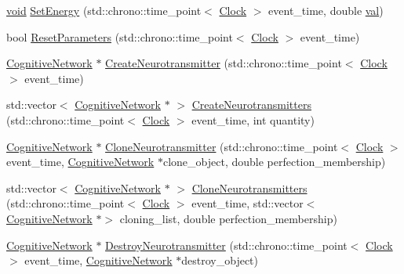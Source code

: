 \begin{DoxyCompactItemize}
\item 
\mbox{\hyperlink{glad_8h_a950fc91edb4504f62f1c577bf4727c29}{void}} \mbox{\hyperlink{class_synaptic_vesicle_ac98f9c8ccaabbccc38151c51d204dfec}{Set\+Energy}} (std\+::chrono\+::time\+\_\+point$<$ \mbox{\hyperlink{universe_8h_a0ef8d951d1ca5ab3cfaf7ab4c7a6fd80}{Clock}} $>$ event\+\_\+time, double \mbox{\hyperlink{glad_8h_a26942fd2ed566ef553eae82d2c109c8f}{val}})
\item 
bool \mbox{\hyperlink{class_synaptic_vesicle_add2f2815448729977fbcdbd5a59ec7b4}{Reset\+Parameters}} (std\+::chrono\+::time\+\_\+point$<$ \mbox{\hyperlink{universe_8h_a0ef8d951d1ca5ab3cfaf7ab4c7a6fd80}{Clock}} $>$ event\+\_\+time)
\item 
\mbox{\hyperlink{class_cognitive_network}{Cognitive\+Network}} $\ast$ \mbox{\hyperlink{class_synaptic_vesicle_a89f4fd3ed27a7dc768de215534325d6a}{Create\+Neurotransmitter}} (std\+::chrono\+::time\+\_\+point$<$ \mbox{\hyperlink{universe_8h_a0ef8d951d1ca5ab3cfaf7ab4c7a6fd80}{Clock}} $>$ event\+\_\+time)
\item 
std\+::vector$<$ \mbox{\hyperlink{class_cognitive_network}{Cognitive\+Network}} $\ast$ $>$ \mbox{\hyperlink{class_synaptic_vesicle_a052b85a42c2d55ca146665c40cbabffd}{Create\+Neurotransmitters}} (std\+::chrono\+::time\+\_\+point$<$ \mbox{\hyperlink{universe_8h_a0ef8d951d1ca5ab3cfaf7ab4c7a6fd80}{Clock}} $>$ event\+\_\+time, int quantity)
\item 
\mbox{\hyperlink{class_cognitive_network}{Cognitive\+Network}} $\ast$ \mbox{\hyperlink{class_synaptic_vesicle_aa811e68d1a3220c07140847eb3ebc8b3}{Clone\+Neurotransmitter}} (std\+::chrono\+::time\+\_\+point$<$ \mbox{\hyperlink{universe_8h_a0ef8d951d1ca5ab3cfaf7ab4c7a6fd80}{Clock}} $>$ event\+\_\+time, \mbox{\hyperlink{class_cognitive_network}{Cognitive\+Network}} $\ast$clone\+\_\+object, double perfection\+\_\+membership)
\item 
std\+::vector$<$ \mbox{\hyperlink{class_cognitive_network}{Cognitive\+Network}} $\ast$ $>$ \mbox{\hyperlink{class_synaptic_vesicle_aa610e38786a8c9978d9c00bca40a5200}{Clone\+Neurotransmitters}} (std\+::chrono\+::time\+\_\+point$<$ \mbox{\hyperlink{universe_8h_a0ef8d951d1ca5ab3cfaf7ab4c7a6fd80}{Clock}} $>$ event\+\_\+time, std\+::vector$<$ \mbox{\hyperlink{class_cognitive_network}{Cognitive\+Network}} $\ast$$>$ cloning\+\_\+list, double perfection\+\_\+membership)
\item 
\mbox{\hyperlink{class_cognitive_network}{Cognitive\+Network}} $\ast$ \mbox{\hyperlink{class_synaptic_vesicle_a5ab4ecfb4a880bc729078f5529c547bc}{Destroy\+Neurotransmitter}} (std\+::chrono\+::time\+\_\+point$<$ \mbox{\hyperlink{universe_8h_a0ef8d951d1ca5ab3cfaf7ab4c7a6fd80}{Clock}} $>$ event\+\_\+time, \mbox{\hyperlink{class_cognitive_network}{Cognitive\+Network}} $\ast$destroy\+\_\+object)
$$
\end{DoxyCompactItemize}
